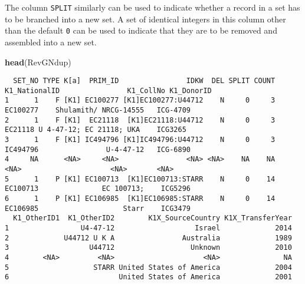 \documentclass[
]{article}
\newenvironment{Shaded}{\begin{snugshade}}{\end{snugshade}}
\newcommand{\CommentTok}[1]{\textcolor[rgb]{0.56,0.35,0.01}{\textit{#1}}}
\newcommand{\DataTypeTok}[1]{\textcolor[rgb]{0.13,0.29,0.53}{#1}}
\newcommand{\DecValTok}[1]{\textcolor[rgb]{0.00,0.00,0.81}{#1}}
\newcommand{\KeywordTok}[1]{\textcolor[rgb]{0.13,0.29,0.53}{\textbf{#1}}}
\newcommand{\NormalTok}[1]{#1}
\newcommand{\OperatorTok}[1]{\textcolor[rgb]{0.81,0.36,0.00}{\textbf{#1}}}
\newcommand{\OtherTok}[1]{\textcolor[rgb]{0.56,0.35,0.01}{#1}}
\newcommand{\StringTok}[1]{\textcolor[rgb]{0.31,0.60,0.02}{#1}}
\begin{document}
The column \texttt{SPLIT} similarly can be used to indicate whether a
record in a set has to be branched into a new set. A set of identical
integers in this column other than the default \texttt{0} can be used to
indicate that they are to be removed and assembled into a new set.

\begin{Shaded}
\end{Shaded}

\begin{Shaded}
\begin{Highlighting}[]
\KeywordTok{head}\NormalTok{(RevGNdup)}
\end{Highlighting}
\end{Shaded}

\begin{verbatim}
  SET_NO TYPE K[a]  PRIM_ID                IDKW  DEL SPLIT COUNT K1_NationalID                K1_CollNo K1_DonorID
1      1    F [K1] EC100277 [K1]EC100277:U44712    N     0     3      EC100277    Shulamith/ NRCG-14555   ICG-4709
2      1    F [K1]  EC21118  [K1]EC21118:U44712    N     0     3       EC21118 U 4-47-12; EC 21118; UKA    ICG3265
3      1    F [K1] IC494796 [K1]IC494796:U44712    N     0     3      IC494796                U-4-47-12   ICG-6890
4     NA      <NA>     <NA>                <NA> <NA>    NA    NA          <NA>                     <NA>       <NA>
5      1    P [K1] EC100713  [K1]EC100713:STARR    N     0    14      EC100713               EC 100713;    ICG5296
6      1    P [K1] EC106985  [K1]EC106985:STARR    N     0    14      EC106985                    Starr    ICG3479
  K1_OtherID1  K1_OtherID2        K1X_SourceCountry K1X_TransferYear
1                 U4-47-12                   Israel             2014
2             U44712 U K A                Australia             1989
3                   U44712                  Unknown             2010
4        <NA>         <NA>                     <NA>               NA
5                    STARR United States of America             2004
6                          United States of America             2001
\end{verbatim}
\end{document}
